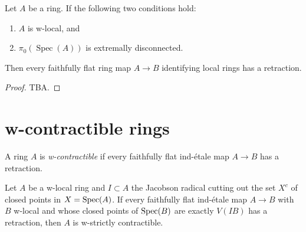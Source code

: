 \begin{proposition}
  \label{thm:ff-identifies-local-rings-has-retraction-if}
  Let $A$ be a ring. If the following two conditions hold:
  \begin{enumerate}
    \item $A$ is w-local, and
    \item $\pi_0(\operatorname{Spec}(A))$ is extremally disconnected.
  \end{enumerate}
  Then every faithfully flat ring map $A \to B$ identifying local rings has a retraction.
\end{proposition}

\begin{proof}
  TBA.
\end{proof}

\section{w-contractible rings}

\begin{definition}
A ring \(A\) is \emph{w-contractible} if every faithfully flat ind-étale map \(A \to B\) has a retraction.
  \label{def:w-contractible-ring}
\end{definition}

\begin{lemma}
  \label{thm:w-contractible-if-ind-etale-plus-c-has-retraction}
  Let \(A\) be a w-local ring and $I \subset A$ the Jacobson radical cutting out the set $X^c$ of closed points in $X = \operatorname{Spec} (A)$. If every faithfully flat ind-étale map \(A \to B\) with \(B\) w-local and whose closed points of \(\operatorname{Spec} (B)\) are exactly \(V(IB)\) has a retraction, then \(A\) is w-strictly contractible.
\end{lemma}

